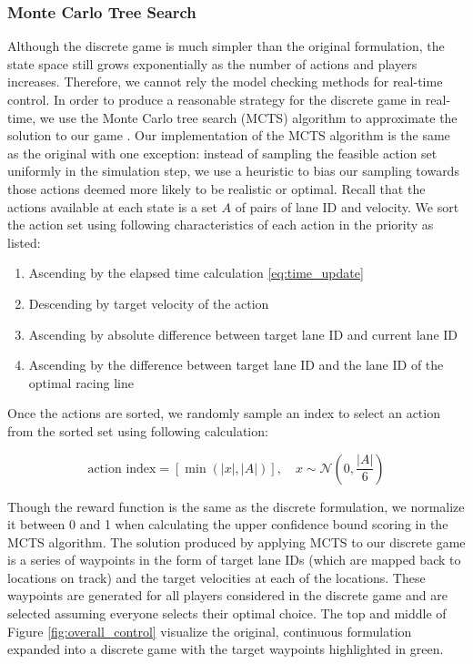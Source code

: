 \subsubsection{Monte Carlo Tree Search}
Although the discrete game is much simpler than the original formulation, the state space still grows exponentially as the number of actions and players increases. Therefore, we cannot rely the model checking methods for real-time control. In order to produce a reasonable strategy for the discrete game in real-time, we use the Monte Carlo tree search (MCTS) algorithm to approximate the solution to our game \cite{mcts}. Our implementation of the MCTS algorithm is the same as the original with one exception: instead of sampling the feasible action set uniformly in the simulation step, we use a heuristic to bias our sampling towards those actions deemed more likely to be realistic or optimal. Recall that the actions available at each state is a set $A$ of pairs of lane ID and velocity. We sort the action set using following characteristics of each action in the priority as listed:
\begin{enumerate}
    \item Ascending by the elapsed time calculation \eqref{eq:time_update}
    \item Descending by target velocity of the action
    \item Ascending by absolute difference between target lane ID and current lane ID
    \item Ascending by the difference between target lane ID and the lane ID of the optimal racing line
\end{enumerate}
Once the actions are sorted, we randomly sample an index to select an action from the sorted set using following calculation:

\begin{equation}
    \text{action index} = [\min(|x|, |A|)], \quad
     x \sim \mathcal{N}(0, \frac{|A|}{6})
\end{equation}

Though the reward function is the same as the discrete formulation, we normalize it between 0 and 1 when calculating the upper confidence bound scoring in the MCTS algorithm. The solution produced by applying MCTS to our discrete game is a series of waypoints in the form of target lane IDs (which are mapped back to locations on track) and the target velocities at each of the locations. These waypoints are generated for all players considered in the discrete game and are selected assuming everyone selects their optimal choice. The top and middle of Figure \ref{fig:overall_control} visualize the original, continuous formulation expanded into a discrete game with the target waypoints highlighted in green.  

